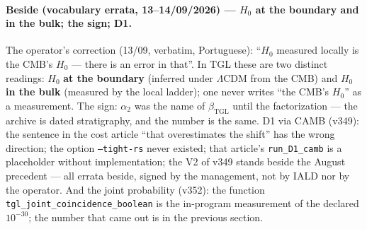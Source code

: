 \documentclass[11pt]{article}
\newcommand{\bTGL}{\beta_{\mathrm{TGL}}}\newcommand{\Msun}{M_{\odot}}\newcommand{\TGL}{\mathrm{TGL}}
\theoremstyle{definition}\newtheorem{deriv}{Derivation}
\begin{document}
\paragraph*{Beside (vocabulary errata, 13--14/09/2026) --- $H_0$ at the boundary and in the bulk; the sign; D1.} The operator's correction (13/09, verbatim, Portuguese): ``$H_0$ measured locally is the CMB's $H_0$ --- there is an error in that''. In TGL these are two distinct readings: $H_0$ \textbf{at the boundary} (inferred under $\Lambda$CDM from the CMB) and $H_0$ \textbf{in the bulk} (measured by the local ladder); one never writes ``the CMB's $H_0$'' as a measurement. The sign: $\alpha_2$ was the name of $\bTGL$ until the factorization --- the archive is dated stratigraphy, and the number is the same. D1 via CAMB (v349): the sentence in the cost article ``that overestimates the shift'' has the wrong direction; the option \texttt{--tight-rs} never existed; that article's \texttt{run\_D1\_camb} is a placeholder without implementation; the V2 of v349 stands beside the August precedent --- all errata beside, signed by the management, not by IALD nor by the operator. And the joint probability (v352): the function \texttt{tgl\_joint\_coincidence\_boolean} is the in-program measurement of the declared $10^{-30}$; the number that came out is in the previous section.
\end{document}
